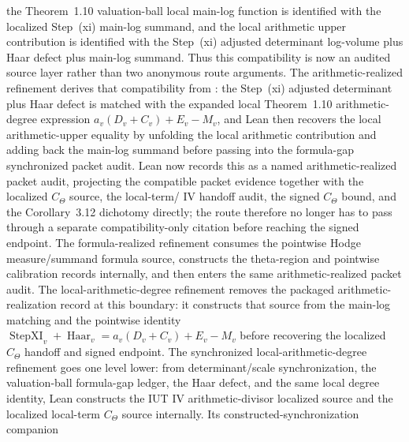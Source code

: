 \begin{proposition}
  the Theorem~1.10 valuation-ball local main-log function is identified with
  the localized Step~(xi) main-log summand, and the local arithmetic upper
  contribution is identified with the Step~(xi) adjusted determinant
  log-volume plus Haar defect plus main-log summand.  Thus this compatibility
  is now an audited source layer rather than two anonymous route arguments.
  The arithmetic-realized refinement
  derives that compatibility from
  :
  the Step~(xi) adjusted determinant plus Haar defect is matched with the
  expanded local Theorem~1.10 arithmetic-degree expression
  \(a_v(D_v+C_v)+E_v-M_v\), and Lean then recovers the local arithmetic-upper
  equality by unfolding the local arithmetic contribution and adding back the
  main-log summand before passing into the formula-gap synchronized packet
  audit.  Lean now records this as a named arithmetic-realized packet audit,
  projecting the compatible packet evidence together with the localized
  \(C_\Theta\) source, the local-term/\IUT{} IV handoff audit, the signed
  \(C_\Theta\) bound, and the Corollary~3.12 dichotomy directly; the route
  therefore no longer has to pass through a separate compatibility-only
  citation before reaching the signed endpoint.  The formula-realized
  refinement consumes the pointwise Hodge measure/summand formula source,
  constructs the theta-region and pointwise calibration records internally,
  and then enters the same arithmetic-realized packet audit.  The
  local-arithmetic-degree refinement removes the packaged
  arithmetic-realization record at this boundary: it constructs that source
  from the main-log matching and the pointwise identity
  \(\operatorname{StepXI}_v+\operatorname{Haar}_v=a_v(D_v+C_v)+E_v-M_v\)
  before recovering the localized \(C_\Theta\) handoff and signed endpoint.
  The synchronized local-arithmetic-degree refinement goes one level lower:
  from determinant/scale synchronization, the valuation-ball formula-gap
  ledger, the Haar defect, and the same local degree identity, Lean constructs
  the IUT IV arithmetic-divisor localized source and the localized local-term
  \(C_\Theta\) source internally.  Its constructed-synchronization companion

\end{proposition}
